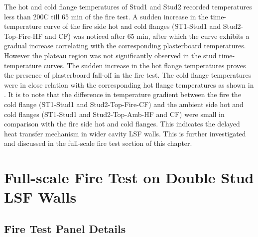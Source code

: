 The hot and cold flange temperatures of Stud1 and Stud2 recorded temperatures less than 200\degree C till 65 min of the fire test. A sudden increase in the time-temperature curve of the fire side hot and cold flanges (ST1-Stud1 and Stud2-Top-Fire-HF and CF) was noticed after 65 min, after which the curve exhibits a gradual increase correlating with the corresponding plasterboard temperatures. However the plateau region was not significantly observed in the stud time-temperature curves. The sudden increase in the hot flange temperatures proves the presence of plasterboard fall-off in the fire test. The cold flange temperatures were in close relation with the corresponding hot flange temperatures as shown in . It is to note that the difference in temperature gradient between the fire the cold flange (ST1-Stud1 and Stud2-Top-Fire-CF) and the ambient side hot and cold flanges (ST1-Stud1 and Stud2-Top-Amb-HF and CF) were small in comparison with the fire side hot and cold flanges. This indicates the delayed heat transfer mechanism in wider cavity LSF walls. This is further investigated and discussed in the full-scale fire test section of this chapter.

\section{Full-scale Fire Test on Double Stud LSF Walls}
\subsection{Fire Test Panel Details}


